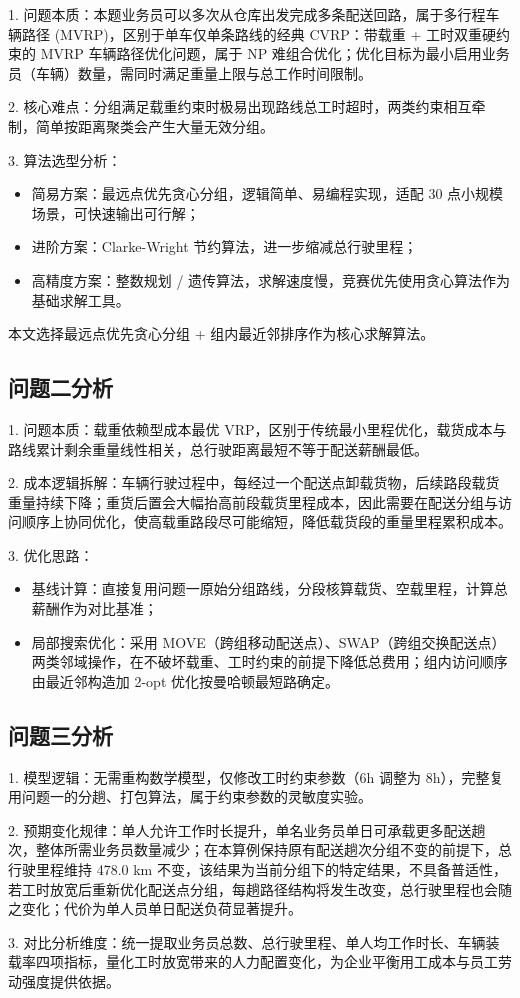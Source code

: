 \documentclass[withoutpreface,bwprint]{cumcmthesis} %
\begin{document}
1.	问题本质：本题业务员可以多次从仓库出发完成多条配送回路，属于多行程车辆路径 (MVRP)，区别于单车仅单条路线的经典 CVRP：带载重 + 工时双重硬约束的 MVRP 车辆路径优化问题，属于 NP 难组合优化；优化目标为最小启用业务员（车辆）数量，需同时满足重量上限与总工作时间限制。
\par2.	核心难点：分组满足载重约束时极易出现路线总工时超时，两类约束相互牵制，简单按距离聚类会产生大量无效分组。
\par3.	算法选型分析： 
 \begin{itemize}
  \item  简易方案：最远点优先贪心分组，逻辑简单、易编程实现，适配 30 点小规模场景，可快速输出可行解；
  \item  进阶方案：Clarke-Wright 节约算法，进一步缩减总行驶里程；
  \item  高精度方案：整数规划 / 遗传算法，求解速度慢，竞赛优先使用贪心算法作为基础求解工具。
\end{itemize}

本文选择最远点优先贪心分组 + 组内最近邻排序作为核心求解算法。

\subsection{问题二分析}

1.	问题本质：载重依赖型成本最优 VRP，区别于传统最小里程优化，载货成本与路线累计剩余重量线性相关，总行驶距离最短不等于配送薪酬最低。
\par2.	成本逻辑拆解：车辆行驶过程中，每经过一个配送点卸载货物，后续路段载货重量持续下降；重货后置会大幅抬高前段载货里程成本，因此需要在配送分组与访问顺序上协同优化，使高载重路段尽可能缩短，降低载货段的重量里程累积成本。
\par3.	优化思路： 
 \begin{itemize}
  \item  基线计算：直接复用问题一原始分组路线，分段核算载货、空载里程，计算总薪酬作为对比基准；
  \item  局部搜索优化：采用 MOVE（跨组移动配送点）、SWAP（跨组交换配送点）两类邻域操作，在不破坏载重、工时约束的前提下降低总费用；组内访问顺序由最近邻构造加 2-opt 优化按曼哈顿最短路确定。
 \end{itemize}

\subsection{问题三分析}
1.	模型逻辑：无需重构数学模型，仅修改工时约束参数（6h 调整为 8h），完整复用问题一的分趟、打包算法，属于约束参数的灵敏度实验。
\par2.	预期变化规律：单人允许工作时长提升，单名业务员单日可承载更多配送趟次，整体所需业务员数量减少；在本算例保持原有配送趟次分组不变的前提下，总行驶里程维持 478.0 km 不变，该结果为当前分组下的特定结果，不具备普适性，若工时放宽后重新优化配送点分组，每趟路径结构将发生改变，总行驶里程也会随之变化；代价为单人员单日配送负荷显著提升。
\par3.	对比分析维度：统一提取业务员总数、总行驶里程、单人均工作时长、车辆装载率四项指标，量化工时放宽带来的人力配置变化，为企业平衡用工成本与员工劳动强度提供依据。
\end{document}
